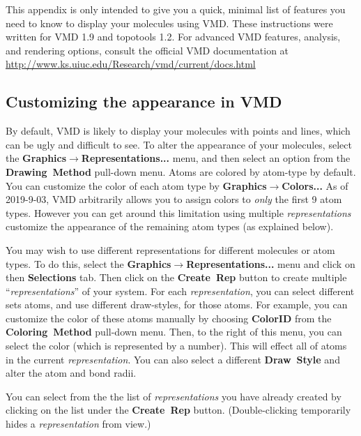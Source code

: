 \documentclass[11pt]{article}
\begin{document}
This appendix is only intended to give you a quick, 
minimal list of features you need to know to 
display your molecules using VMD. 
These instructions were written for VMD 1.9 
and topotools 1.2.
For advanced VMD features, analysis, and rendering options,
consult the official VMD documentation at
\url{http://www.ks.uiuc.edu/Research/vmd/current/docs.html}

\subsection{Customizing the appearance in VMD}
\label{sec:vmd_representation}
By default, VMD is likely to display your molecules with 
points and lines, which can be ugly and difficult to see.
To alter the appearance of your molecules, select the 
\textbf{Graphics}$\rightarrow$\textbf{Representations...} menu, 
and then select an option from the 
\mbox{\textbf{Drawing Method}} pull-down menu.
Atoms are colored by atom-type by default.
You can customize the color of each atom type by 
\mbox{\textbf{Graphics}}$\rightarrow$\mbox{\textbf{Colors...}}
As of 2019-9-03, VMD arbitrarily allows you to
assign colors to \textit{only} the first 9 atom types.
However you can get around this limitation
using multiple \textit{representations} 
customize the appearance of the 
remaining atom types (as explained below).

You may wish to use different representations for different molecules 
or atom types.  To do this, select the
\textbf{Graphics}$\rightarrow$\textbf{Representations...} menu
and click on then \mbox{\textbf{Selections}} tab.
Then click on the \mbox{\textbf{Create Rep}} 
button to create multiple ``\textit{representations}'' of your system.
For each \textit{representation}, you can select different sets atoms, 
and use different draw-styles, for those atoms.
For example, you can customize the color of these atoms manually 
by choosing \textbf{ColorID} from the 
\mbox{\textbf{Coloring Method}} pull-down menu.
Then, to the right of this menu, you can select the color 
(which is represented by a number).
This will effect all of atoms in the current \textit{representation}.
You can also select a different \mbox{\textbf{Draw Style}} and
alter the atom and bond radii.

You can select from the the list of \textit{representations} you have 
already created
by clicking on the list under the \mbox{\textbf{Create Rep}} button.
(Double-clicking temporarily hides a \textit{representation} from view.)
\end{document}
